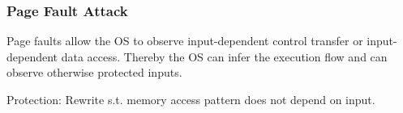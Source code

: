 \subsubsection{Page Fault Attack}
Page faults allow the OS to observe input-dependent control transfer or
input-dependent data access. Thereby the OS can infer the execution flow and
can observe otherwise protected inputs.

Protection: Rewrite s.t. memory access pattern does not depend on input.
